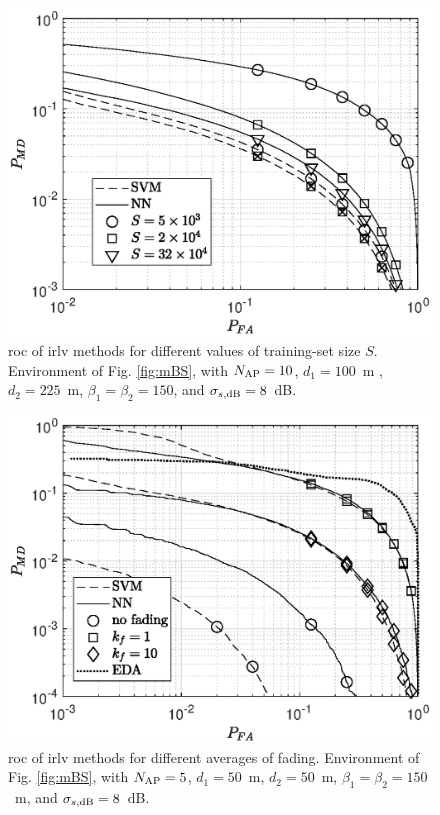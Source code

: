 \documentclass[draftcls,onecolumn,12pt]{IEEEtran}
\begin{document}
\begin{figure}[t]
    \centering
    \includegraphics[width=0.6\columnwidth]{res_training_10BS_2Class_newArea.eps}
    \caption{\ac{roc} of \ac{irlv} methods for different values of training-set size $S$. Environment of Fig. \ref{fig:mBS}, with  $N_{\rm AP}=10$, $d_1 = 100$~m , $d_2 = 225$~m, $\beta_1 = \beta_2 = 150$, and $\sigma_{s,{\rm dB}} = 8$~dB.}
    \label{fig:kf1_newArea}
\end{figure}


\begin{figure}[t]
    \centering
    \includegraphics[width=0.6\columnwidth]{res_fading_5BS_2Class.eps}
    \caption{\ac{roc} of \ac{irlv} methods for different averages of fading. Environment of Fig. \ref{fig:mBS}, with  $N_{\rm AP}=5$, $d_1 = 50 $~m, $d_2 = 50$~m, $\beta_1 = \beta_2 = 150$~m, and $\sigma_{s,{\rm dB}} = 8$~dB.}
    \label{fig:kf10-5}
\end{figure}


\end{document}
